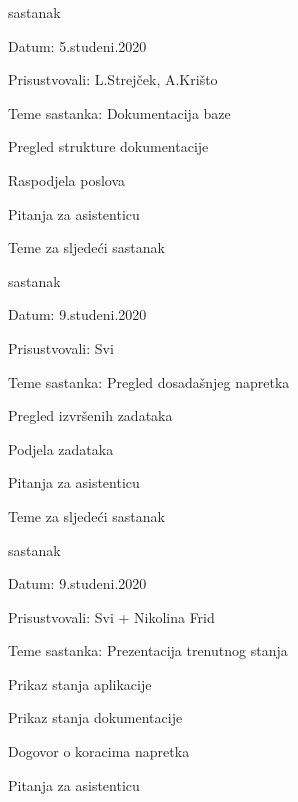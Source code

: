 \begin{packed_enum}
				\item  sastanak
			\item[] \begin{packed_item}
				\item Datum: 5.studeni.2020
				\item Prisustvovali: L.Strejček, A.Krišto
				\item Teme sastanka: Dokumentacija baze
				\begin{packed_item}
				    \item Pregled strukture dokumentacije
					\item Raspodjela poslova
					\item Pitanja za asistenticu
					\item Teme za sljedeći sastanak
				\end{packed_item}
			\end{packed_item}
			
			\item  sastanak
			\item[] \begin{packed_item}
				\item Datum: 9.studeni.2020
				\item Prisustvovali: Svi
				\item Teme sastanka: Pregled dosadašnjeg napretka
				\begin{packed_item}
				    \item Pregled izvršenih zadataka
					\item Podjela zadataka
					\item Pitanja za asistenticu
					\item Teme za sljedeći sastanak
				\end{packed_item}
			\end{packed_item}
			
			\item  sastanak
			\item[] \begin{packed_item}
				\item Datum: 9.studeni.2020
				\item Prisustvovali: Svi + Nikolina Frid
				\item Teme sastanka: Prezentacija trenutnog stanja
				\begin{packed_item}
				    \item Prikaz stanja aplikacije
					\item Prikaz stanja dokumentacije
					\item Dogovor o koracima napretka
					\item Pitanja za asistenticu
				\end{packed_item}
			\end{packed_item}
			

\end{packed_enum}
